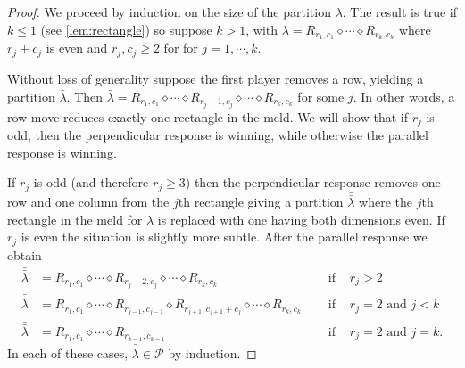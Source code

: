 \documentclass[10pt,a4paper]{amsart}
\newcommand{\p}{\mathcal P}
\begin{document}
\begin{proof}
We proceed by induction on the size of the partition $\lambda$. 
The result is true if $k \le 1$ (see \cref{lem:rectangle}) so suppose $k > 1$, with
 $\lambda = R_{r_1, c_1} \diamond \cdots \diamond R_{r_k, c_k}$ where $r_j + c_j$ is even and $r_j, c_j \geq 2$ for for $j = 1, \cdots, k$. 

Without loss of generality suppose the first player removes a row, yielding a partition $\bar \lambda$. Then $\bar \lambda = R_{r_1, c_1} \diamond \cdots \diamond R_{r_j-1, c_j} \diamond \cdots \diamond R_{r_k, c_k}$ for some $j$. In other words, a row move reduces exactly one rectangle in the meld. 
We will show that if $r_j$ is odd, then the perpendicular response is winning, while otherwise the parallel response is winning.


If $r_j$ is odd (and therefore $r_j\ge 3$) then the perpendicular response removes one row and one column from the $j$th rectangle giving a partition $\bar{\bar \lambda}$ where the $j$th rectangle in the meld for $\lambda$ is replaced with one having both dimensions even. If $r_j$ is even the situation is slightly more subtle. After the parallel response we obtain
\begin{align*}
    \bar {\bar \lambda} &= R_{r_1, c_1} \diamond \cdots \diamond R_{r_j - 2, c_j} \diamond \cdots \diamond R_{r_k, c_k} &  \quad \text{ if }& r_j > 2 \\
    \bar {\bar \lambda} &= R_{r_1, c_1} \diamond \cdots \diamond R_{r_{j-1}, c_{j-1}}
     \diamond R_{r_{j+1}, c_{j+1}+c_j} \diamond \cdots \diamond R_{r_k, c_k} & \quad \text{ if }& r_j = 2 \text{ and } j < k \\
     \bar {\bar \lambda} &= R_{r_1, c_1} \diamond \cdots \diamond R_{r_{k-1}, c_{k-1}} & \quad \text{ if }& r_j = 2 \text{ and } j = k.
\end{align*}
In each of these cases, $\bar {\bar \lambda} \in \p$ by induction. 
\end{proof}
\end{document}
